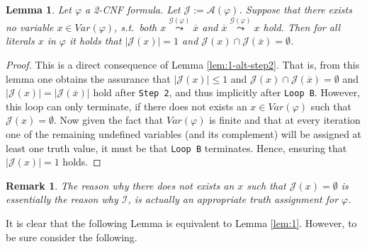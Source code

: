 \documentclass [11pt]{article}
\def\ox{\overline{x}}
\newcommand{\var}{\mathit{Var}}
\newtheorem{lemma}[theorem]{Lemma}
\newtheorem{remark}[theorem]{Remark}
\newcommand{\sreach}[1]{\stackrel{#1}{\leadsto}}
\begin{document}
\begin{lemma}
\label{lem:1-alt}
Let $\varphi$ a 2-CNF formula. Let $\mathcal{J}:=\mathcal{A}(\varphi)$. Suppose that there exists no variable $x \in \var(\varphi)$, s.t.\ both $x \sreach{\mathcal{G}(\varphi)} \ox$ and $\ox \sreach{\mathcal{G}(\varphi)}  x$ hold.
Then for all literals $x$ in $\varphi$ it holds that $|\mathcal{J}(x)|=1$ and $\mathcal{J}(x) \cap \mathcal{J}(\overline{x}) = \emptyset$.
\end{lemma}
\begin{proof}
This is a direct consequence of Lemma \ref{lem:1-alt-step2}. That is, from this lemma one obtains the assurance that $|\mathcal{J}(x)|\leq1$ and $\mathcal{J}(x) \cap \mathcal{J}(\overline{x}) = \emptyset$ and $|\mathcal{J}(x)| =| \mathcal{J}(\overline{x})|$ hold after \texttt{Step 2}, and thus implicitly after \texttt{Loop B}. However, this loop can only terminate, if there does not exists an $x \in \var(\varphi)$ such that $\mathcal{J}(x)=\emptyset$. Now given the fact that $\var(\varphi)$ is finite and that at every iteration one of the remaining undefined variables (and its complement) will be assigned at least one truth value, it must be that \texttt{Loop B} terminates. Hence, ensuring that $|\mathcal{J}(x)|=1$ holds.
\end{proof}

\begin{remark}
The reason why there does not exists an $x$ such that $\mathcal{J}(x)=\emptyset$ is essentially the reason why $\mathcal{I}$, is actually an \emph{appropriate} truth assignment for $\varphi$.
\end{remark}
It is clear that the following Lemma is equivalent to Lemma \ref{lem:1}. However, to be sure consider the following.
\end{document}
